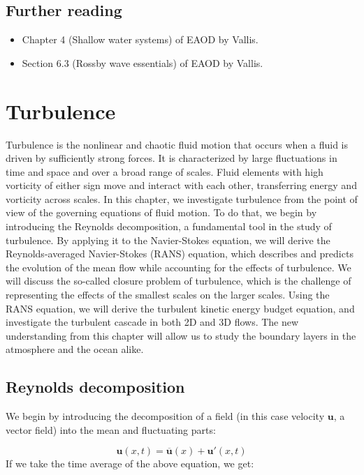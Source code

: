 \documentclass[12pt]{article}
\numberwithin{equation}{section}
\numberwithin{figure}{section}
\numberwithin{table}{section}
\begin{document}
\subsection*{Further reading}

\begin{itemize}
  \item Chapter 4 (Shallow water systems) of EAOD by Vallis.
  \item Section 6.3 (Rossby wave essentials) of EAOD by Vallis.
\end{itemize}

\newpage
\section{Turbulence}
\label{sec:turbulence}

Turbulence is the nonlinear and chaotic fluid motion that occurs when a fluid
is driven by sufficiently strong forces.
It is characterized by large fluctuations in time and space and over a broad
range of scales.
Fluid elements with high vorticity of either sign move and interact with each
other, transferring energy and vorticity across scales.
In this chapter, we investigate turbulence from the point of view of the
governing equations of fluid motion.
To do that, we begin by introducing the Reynolds decomposition, a fundamental
tool in the study of turbulence.
By applying it to the Navier-Stokes equation, we will derive the Reynolds-averaged
Navier-Stokes (RANS) equation, which describes and predicts the evolution of the
mean flow while accounting for the effects of turbulence.
We will discuss the so-called closure problem of turbulence, which is the
challenge of representing the effects of the smallest scales on the larger scales.
Using the RANS equation, we will derive the turbulent kinetic energy budget
equation, and investigate the turbulent cascade in both 2D and 3D flows.
The new understanding from this chapter will allow us to study the boundary
layers in the atmosphere and the ocean alike.

\subsection{Reynolds decomposition}
\label{sec:reynolds_decomposition}

We begin by introducing the decomposition of a field (in this case velocity
$\mathbf{u}$, a vector field) into the mean and fluctuating parts:

\begin{equation}
  \mathbf{u}(x, t) = \overline{\mathbf{u}}(x) + \mathbf{u}'(x, t)
\end{equation}
If we take the time average of the above equation, we get:
\end{document}
